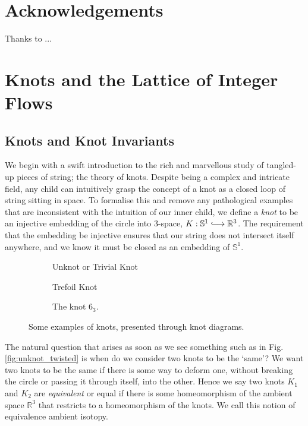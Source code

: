 \documentclass[12pt]{report}
\newcommand{\R}{\mathbb{R}}
\renewcommand{\S}{\mathbb{S}}
\begin{document}
\chapter*{Acknowledgements}

Thanks to ...


\chapter{Knots and the Lattice of Integer Flows}

\section{Knots and Knot Invariants}

We begin with a swift introduction to the rich and marvellous study of tangled-up pieces of string; the theory of knots. Despite being a complex and intricate field, any child can intuitively grasp the concept of a knot as a closed loop of string sitting in space. To formalise this and remove any pathological examples that are inconsistent with the intuition of our inner child, we define a \textit{knot} to be an injective embedding of the circle into $3$-space, $K: \S^{1} \lhook\joinrel\longrightarrow \R^{3}$. The requirement that the embedding be injective ensures that our string does not intersect itself anywhere, and we know it must be closed as an embedding of $\S^{1}$.

\begin{figure}[hbt]
	\centering
	\hfill
	\begin{subfigure}[b]{0.3 \textwidth}
		\centering
		\def\svgscale{0.2}
		
		\caption{Unknot or Trivial Knot}
	\end{subfigure}
	\hfill
	\begin{subfigure}[b]{0.3 \textwidth}
		\centering
		\def\svgscale{0.2}
		
		\caption{Trefoil Knot}
	\end{subfigure}
	\hfill
	\begin{subfigure}[b]{0.3 \textwidth}
		\centering
		\def\svgscale{0.2}
		
		\caption{The knot $6_{3}$.}
	\end{subfigure}
	\caption{Some examples of knots, presented through knot diagrams.}
	\label{fig:knot-examples}
	\hfill \phantom{1}
\end{figure}

The natural question that arises as soon as we see something such as in Fig. \ref{fig:unknot_twisted} is when do we consider two knots to be the `same'? We want two knots to be the same if there is some way to deform one, without breaking the circle or passing it through itself, into the other. Hence we say two knots $K_{1}$ and $K_{2}$ are \textit{equivalent} or equal if there is some homeomorphism of the ambient space $\R^{3}$ that restricts to a homeomorphism of the knots. We call this notion of equivalence ambient isotopy.
\end{document}
